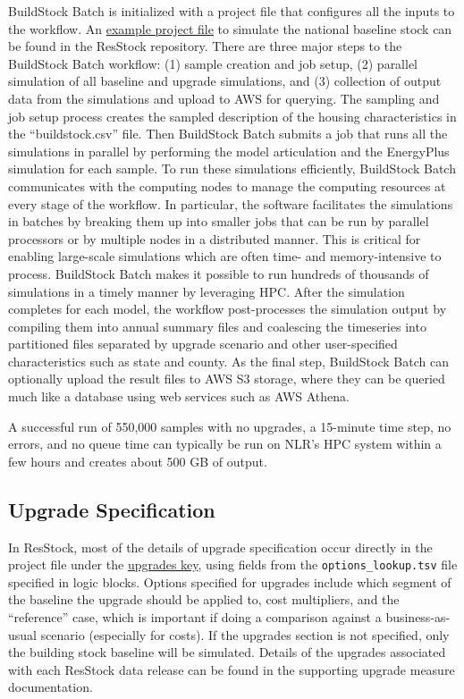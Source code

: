 BuildStock Batch is initialized with a project file that configures all the inputs to the workflow. An \href{https://github.com/NREL/resstock/blob/develop/project_national/national_baseline.yml}{example project file} to simulate the national baseline stock can be found in the ResStock repository. There are three major steps to the BuildStock Batch workflow: (1) sample creation and job setup, (2) parallel simulation of all baseline and upgrade simulations, and (3) collection of output data from the simulations and upload to AWS for querying. The sampling and job setup process creates the sampled description of the housing characteristics in the ``buildstock.csv'' file. Then BuildStock Batch submits a job that runs all the simulations in parallel by performing the model articulation and the EnergyPlus simulation for each sample. To run these simulations efficiently, BuildStock Batch communicates with the computing nodes to manage the computing resources at every stage of the workflow. In particular, the software facilitates the simulations in batches by breaking them up into smaller jobs that can be run by parallel processors or by multiple nodes in a distributed manner. This is critical for enabling large-scale simulations which are often time- and memory-intensive to process. BuildStock Batch makes it possible to run hundreds of thousands of simulations in a timely manner by leveraging HPC. After the simulation completes for each model, the workflow post-processes the simulation output by compiling them into annual summary files and coalescing the timeseries into partitioned files separated by upgrade scenario and other user-specified characteristics such as state and county. As the final step, BuildStock Batch can optionally upload the result files to AWS S3 storage, where they can be queried much like a database using web services such as AWS Athena.

A successful run of 550,000 samples with no upgrades, a 15-minute time step, no errors, and no queue time can typically be run on NLR's HPC system within a few hours and creates about 500 GB of output.

\subsection{Upgrade Specification}\label{sec:upgrades}
In ResStock, most of the details of upgrade specification occur directly in the project file under the \href{https://buildstockbatch.readthedocs.io/en/v2023.10.0/project_defn.html#upgrade-scenarios}{upgrades key}, using fields from the \texttt{options\_lookup.tsv} file specified in logic blocks. Options specified for upgrades include which segment of the baseline the upgrade should be applied to, cost multipliers, and the ``reference'' case, which is important if doing a comparison against a business-as-usual scenario (especially for costs). If the upgrades section is not specified, only the building stock baseline will be simulated. Details of the upgrades associated with each ResStock data release can be found in the supporting upgrade measure documentation.

